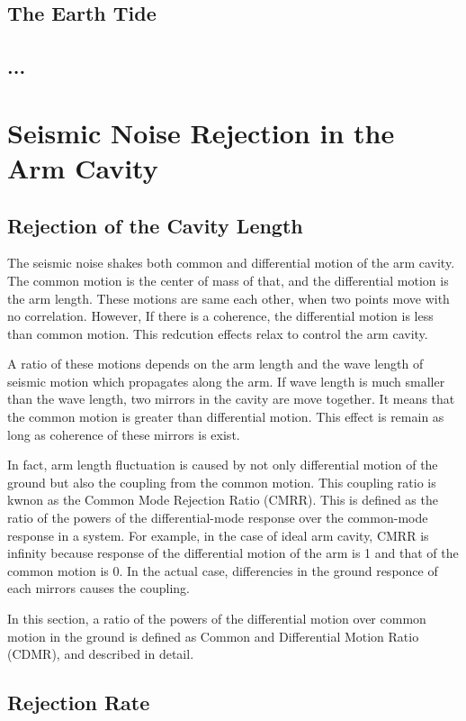 \documentclass[a4paper,12pt]{book}
\begin{document}
\subsection{The Earth Tide}
\subsection{...}
\section{Seismic Noise Rejection in the Arm Cavity}
\subsection{Rejection of the Cavity Length}
The seismic noise shakes both common and differential motion of the arm cavity. The common motion is the center of mass of that, and the differential motion is the arm length. These motions are same each other, when two points move with no correlation. However, If there is a coherence, the differential motion is less than common motion. This redcution effects relax to control the arm cavity.

A ratio of these motions depends on the arm length and the wave length of seismic motion which propagates along the arm. If wave length is much smaller than the wave length, two mirrors in the cavity are move together. It means that the common motion is greater than differential motion. This effect is remain as long as coherence of these mirrors is exist.

In fact, arm length fluctuation is caused by not only differential motion of the ground but also the coupling from the common motion. This coupling ratio is kwnon as the Common Mode Rejection Ratio (CMRR). This is defined as the ratio of the powers of the differential-mode response over the common-mode response in a system. For example, in the case of ideal arm cavity, CMRR is infinity because response of the differential motion of the arm is 1 and that of the common motion is 0. In the actual case, differencies in the ground responce of each mirrors causes the coupling.

In this section, a ratio of the powers of the differential motion over common motion in the ground is defined as Common and Differential Motion Ratio (CDMR), and described in detail.

\subsection{Rejection Rate}
\end{document}
